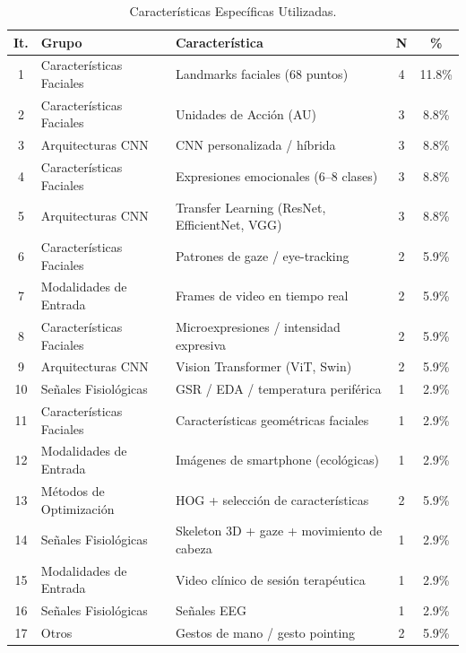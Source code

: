 \documentclass[3p,twocolumn,times]{elsarticle}
\begin{document}
	\begin{table}[t]
		\centering
		\caption{Características Específicas Utilizadas.}\label{tab11}
		\begin{tabular}{cllcc}
			\toprule
			\textbf{It.} & \textbf{Grupo} & \textbf{Característica} & \textbf{N} & \textbf{\%} \\
			\midrule
			1  & Características Faciales & Landmarks faciales (68 puntos)            & 4 & 11.8\% \\
			2  & Características Faciales & Unidades de Acción (AU)                   & 3 & 8.8\%  \\
			3  & Arquitecturas CNN        & CNN personalizada / híbrida               & 3 & 8.8\%  \\
			4  & Características Faciales & Expresiones emocionales (6--8 clases)     & 3 & 8.8\%  \\
			5  & Arquitecturas CNN        & Transfer Learning (ResNet, EfficientNet, VGG) & 3 & 8.8\% \\
			6  & Características Faciales & Patrones de gaze / eye-tracking           & 2 & 5.9\%  \\
			7  & Modalidades de Entrada   & Frames de video en tiempo real            & 2 & 5.9\%  \\
			8  & Características Faciales & Microexpresiones / intensidad expresiva   & 2 & 5.9\%  \\
			9  & Arquitecturas CNN        & Vision Transformer (ViT, Swin)            & 2 & 5.9\%  \\
			10 & Señales Fisiológicas     & GSR / EDA / temperatura periférica        & 1 & 2.9\%  \\
			11 & Características Faciales & Características geométricas faciales      & 1 & 2.9\%  \\
			12 & Modalidades de Entrada   & Imágenes de smartphone (ecológicas)       & 1 & 2.9\%  \\
			13 & Métodos de Optimización  & HOG + selección de características        & 2 & 5.9\%  \\
			14 & Señales Fisiológicas     & Skeleton 3D + gaze + movimiento de cabeza & 1 & 2.9\%  \\
			15 & Modalidades de Entrada   & Video clínico de sesión terapéutica       & 1 & 2.9\%  \\
			16 & Señales Fisiológicas     & Señales EEG                               & 1 & 2.9\%  \\
			17 & Otros                    & Gestos de mano / gesto pointing           & 2 & 5.9\%  \\

\end{tabular}
\end{table}
\end{document}
